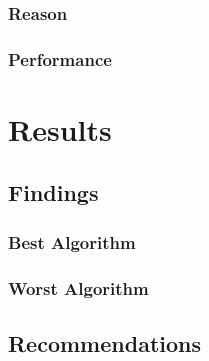 \documentclass[12pt]{article}
\begin{document}
	\subsubsection{Reason}
	\subsubsection{Performance}
	\newpage
	\section{Results}
	\subsection{Findings}
	\subsubsection{Best Algorithm}
	\subsubsection{Worst Algorithm}
	\subsection{Recommendations}
	
\end{document}
